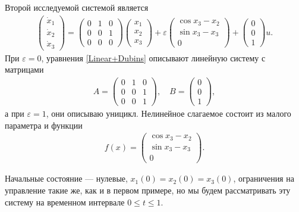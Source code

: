 \documentclass[../main.tex]{subfiles}
\begin{document}
\begin{pr}  
	Второй исследуемой системой является
	\begin{gather}\label{Linear+Dubins}
		\begin{pmatrix} 
			\dot{x}_1 \\
			\dot{x}_2 \\ 
			\dot{x}_3 \end{pmatrix} = 
		\begin{pmatrix}
			0 & 1 & 0 \\
			0 & 0 & 1 \\
			0 & 0 & 0
		\end{pmatrix}
		\begin{pmatrix} 
			x_1 \\
			x_2 \\ 
			x_3 \end{pmatrix} + 
		\varepsilon
		\begin{pmatrix}
			\cos x_3 - x_2\\
			\sin x_3 - x_3 \\
			0
		\end{pmatrix} + 
		\begin{pmatrix}
			0 \\ 0 \\ 1
		\end{pmatrix} u.
	\end{gather}
	При $\varepsilon = 0$, уравнения \eqref{Linear+Dubins} описывают линейную систему с матрицами 
	\begin{gather*}
		A = \begin{pmatrix} 0 & 1 & 0\\
			0 & 0 & 1\\ 
			0 & 0 & 1 
		\end{pmatrix}, \quad B = \begin{pmatrix}
			0\\
			0\\
			1
		\end{pmatrix},
	\end{gather*}
	а при $\varepsilon = 1$, они описываю уницикл. 
	Нелинейное слагаемое состоит из малого параметра и функции
	\begin{gather*}
		f(x) = \begin{pmatrix}
			\cos x_3 - x_2\\
			\sin x_3 - x_3 \\
			0
		\end{pmatrix}.
	\end{gather*}
	
	Начальные состояние --- нулевые, $x_1(0) = x_2(0) = x_3(0) $, ограничения на управление такие же, как и в первом примере, но мы будем рассматривать эту систему на временном интервале $0 \leqslant t \leqslant 1$.
	

\end{pr}
\end{document}
